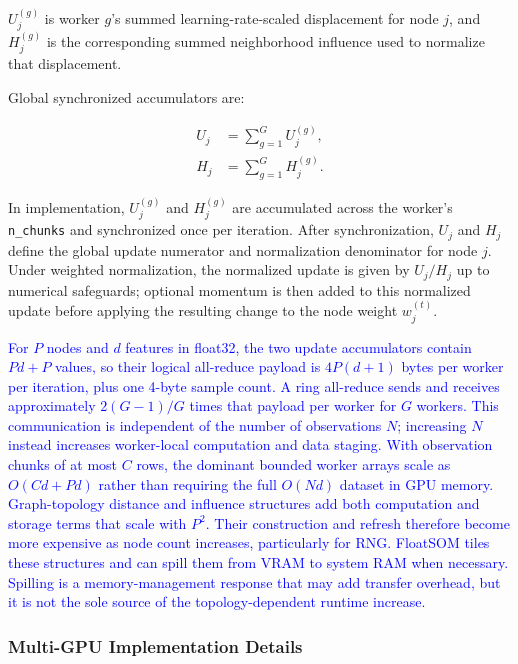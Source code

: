 \documentclass[10pt]{article} %
\newcommand{\TrackedChange}[1]{\textcolor{blue}{#1}}
\begin{document}
$U_j^{(g)}$ is worker $g$'s summed learning-rate-scaled displacement for node $j$, and $H_j^{(g)}$ is the corresponding summed neighborhood influence used to normalize that displacement.

Global synchronized accumulators are:

\begin{equation*}
\begin{aligned}
U_j &= \sum_{g=1}^{G} U_j^{(g)}, \\
H_j &= \sum_{g=1}^{G} H_j^{(g)}.
\end{aligned}
\tag{4}
\end{equation*}

In implementation, $U_j^{(g)}$ and $H_j^{(g)}$ are accumulated across the worker's \texttt{n\_chunks} and synchronized once per iteration. After synchronization, $U_j$ and $H_j$ define the global update numerator and normalization denominator for node $j$. Under weighted normalization, the normalized update is given by $U_j/H_j$ up to numerical safeguards; optional momentum is then added to this normalized update before applying the resulting change to the node weight $w_j^{(t)}$.

\TrackedChange{For $P$ nodes and $d$ features in float32, the two update accumulators contain $P d+P$ values, so their logical all-reduce payload is $4P(d+1)$ bytes per worker per iteration, plus one 4-byte sample count.} \TrackedChange{A ring all-reduce sends and receives approximately $2(G-1)/G$ times that payload per worker for $G$ workers.} \TrackedChange{This communication is independent of the number of observations $N$; increasing $N$ instead increases worker-local computation and data staging.} \TrackedChange{With observation chunks of at most $C$ rows, the dominant bounded worker arrays scale as $O(Cd+Pd)$ rather than requiring the full $O(Nd)$ dataset in GPU memory.} \TrackedChange{Graph-topology distance and influence structures add both computation and storage terms that scale with $P^2$.} \TrackedChange{Their construction and refresh therefore become more expensive as node count increases, particularly for RNG.} \TrackedChange{FloatSOM tiles these structures and can spill them from VRAM to system RAM when necessary.} \TrackedChange{Spilling is a memory-management response that may add transfer overhead, but it is not the sole source of the topology-dependent runtime increase.}

\subsubsection{Multi-GPU Implementation Details}
\end{document}
